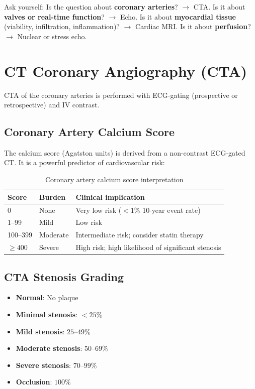 \begin{pearlbox}
Ask yourself: Is the question about \textbf{coronary arteries}? $\rightarrow$ CTA. Is it about \textbf{valves or real-time function}? $\rightarrow$ Echo. Is it about \textbf{myocardial tissue} (viability, infiltration, inflammation)? $\rightarrow$ Cardiac MRI. Is it about \textbf{perfusion}? $\rightarrow$ Nuclear or stress echo.
\end{pearlbox}


\section{CT Coronary Angiography (CTA)}
CTA of the coronary arteries is performed with ECG-gating (prospective or retrospective) and IV contrast.

\subsection{Coronary Artery Calcium Score}
The calcium score (Agatston units) is derived from a non-contrast ECG-gated CT. It is a powerful predictor of cardiovascular risk:

\begin{table}[h]
\centering
\caption{Coronary artery calcium score interpretation}
\begin{tabular}{p{2.5cm} p{4cm} p{4cm}}
\hline
\textbf{Score} & \textbf{Burden} & \textbf{Clinical implication} \\
\hline
0 & None & Very low risk ($< 1\%$ 10-year event rate) \\
1--99 & Mild & Low risk \\
100--399 & Moderate & Intermediate risk; consider statin therapy \\
$\geq 400$ & Severe & High risk; high likelihood of significant stenosis \\
\hline
\end{tabular}
\end{table}

\subsection{CTA Stenosis Grading}
\begin{itemize}
  \item \textbf{Normal}: No plaque
  \item \textbf{Minimal stenosis}: $< 25\%$
  \item \textbf{Mild stenosis}: $25$--$49\%$
  \item \textbf{Moderate stenosis}: $50$--$69\%$
  \item \textbf{Severe stenosis}: $70$--$99\%$
  \item \textbf{Occlusion}: $100\%$
\end{itemize}


